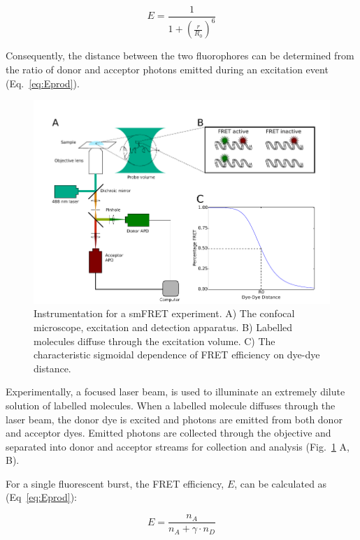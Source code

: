 \begin{equation}
E = \frac{1}{1 + (\frac{r}{R_0})^6} 
\label{eq:efficiency}
\end{equation}

Consequently, the distance between the two fluorophores can be determined from the ratio of donor and acceptor photons emitted during an excitation event (Eq.~\ref{eq:Eprod}).

\begin{figure}[!ht]
   \begin{center}
      \includegraphics*[clip=true, width=6in]{pyFRET/Fig1_schematic.pdf}
      \caption{Instrumentation for a smFRET experiment. A) The confocal microscope, excitation and detection apparatus. B) Labelled molecules diffuse through the excitation volume. C) The characteristic sigmoidal dependence of FRET efficiency on dye-dye distance.}
      \label{fig:fig1_instrumentation}
   \end{center}
\end{figure}


Experimentally, a focused laser beam, is used to illuminate an extremely dilute solution of labelled molecules. When a labelled molecule diffuses through the laser beam, the donor dye is excited and photons are emitted from both donor and acceptor dyes.  Emitted photons are collected through the objective and separated into donor and acceptor streams for collection and analysis (Fig.~\ref{fig:fig1_instrumentation} A, B). 

For a single fluorescent burst, the FRET efficiency, $E$, can be calculated as (Eq~\ref{eq:Eprod}):

\begin{equation}
E = \frac{n_A}{n_A + \gamma \cdot n_D}
\label{eq:Eprod}
\end{equation} 

